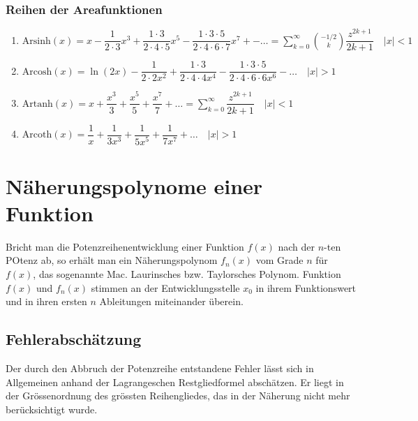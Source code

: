 \subsubsection{Reihen der Areafunktionen}
\begin{enumerate}[$(a)$]
\item $\text{Arsinh}\left(x\right)=x-\dfrac{1}{2\cdot 3}x^3+\dfrac{1\cdot 3}{2\cdot 4\cdot 5}x^5-\dfrac{1\cdot 3\cdot 5}{2\cdot 4\cdot 6\cdot 7}x^7+-\dotso=\displaystyle \sum_{k=0}^{\infty}\binom{-1/2}{k}\dfrac{z^{2k+1}}{2k+1}\quad \Big\vert x\Big\vert<1$
\item $\text{Arcosh}\left(x\right)=\ln\left(2x\right)-\dfrac{1}{2\cdot 2x^2}+\dfrac{1\cdot 3}{2\cdot 4\cdot 4x^4}-\dfrac{1\cdot 3\cdot 5}{2\cdot 4\cdot 6\cdot 6x^6}-\dotso\quad \Big\vert x\Big\vert>1$
\item $\text{Artanh}\left(x\right)=x+\dfrac{x^3}{3}+\dfrac{x^5}{5}+\dfrac{x^7}{7}+\dotso=\displaystyle \sum_{k=0}^{\infty}\dfrac{z^{2k+1}}{2k+1}\quad \Big\vert x\Big\vert<1$
\item $\text{Arcoth}\left(x\right)=\dfrac{1}{x}+\dfrac{1}{3x^3}+\dfrac{1}{5x^5}+\dfrac{1}{7x^7}+\dotso\quad \Big\vert x\Big\vert>1$
\end{enumerate}
\section{Näherungspolynome einer Funktion}
Bricht man die Potenzreihenentwicklung einer Funktion $f\left(x\right)$ nach der $n$-ten POtenz ab, so erhält man ein Näherungspolynom $f_n\left(x\right)$ vom Grade $n$ für $f\left(x\right)$, das sogenannte Mac. Laurinsches bzw. Taylorsches Polynom. Funktion $f\left(x\right)$ und $f_n\left(x\right)$ stimmen an der Entwicklungsstelle $x_0$ in ihrem Funktionswert und in ihren ersten $n$ Ableitungen miteinander überein.
\subsection{Fehlerabschätzung}
Der durch den Abbruch der Potenzreihe entstandene Fehler lässt sich in Allgemeinen anhand der Lagrangeschen Restgliedformel abschätzen. Er liegt in der Grössenordnung des grössten Reihengliedes, das in der Näherung nicht mehr berücksichtigt wurde.
